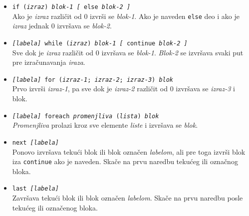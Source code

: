 \documentclass[12pt,a4paper]{article}
\begin{document}
\begin{itemize}
\begin{itemize}
          \end{itemize}
        \item
          {\tt if ({\it izraz}) {\it blok-1 [} else {\it blok-2 ]}}\\
          Ako je {\it izraz} razli\v cit od 0 izvr\v si se {\it blok-1}.
          Ako je naveden {\tt else} deo i ako je {\it izraz} jednak 0
          izvr\v sava se {\it blok-2}.
        \item
          {\tt {\it [labela]} while ({\it izraz}) {\it blok-1 [} continue
          {\it blok-2 ]}}\\
          Sve dok je {\it izraz} razli\v cit od 0 izvr\v sava se {\it blok-1}.
          {\it Blok-2} se izvr\v sava svaki put pre izra\v cunavanja
          {\it iraza}.
        \item
          {\tt {\it [labela]} for ({\it izraz-1}; {\it izraz-2};
          {\it izraz-3}) {\it blok}}\\
          Prvo izvr\v si {\it izraz-1}, pa sve dok je {\it izraz-2}
          razli\v cit od 0 izvr\v sava se {\it izraz-3} i blok.
        \item
          {\tt {\it [labela]} foreach {\it promenjliva} ({\it lista})
          {\it blok}}\\
          {\it Promenjliva} prolazi kroz sve elemente {\it liste} i
          izvr\v sava se {\it blok}.
        \item
          {\tt next {\it [labela]}}\\
          Ponovo izvr\v sava teku\'ci blok ili blok ozna\v cen {\it labelom},
          ali pre toga izvr\v si blok iza {\tt continue} ako je naveden.
          Ska\v ce na prvu naredbu teku\'ceg ili ozna\v cnog bloka.
        \item
          {\tt last {\it [labela]}}\\
          Zavr\v sava teku\'ci blok ili blok ozna\v cen {\it labelom}.
          Ska\v ce na prvu naredbu posle teku\'ceg ili ozna\v cenog bloka.
        \end{itemize}
%
\end{document}
